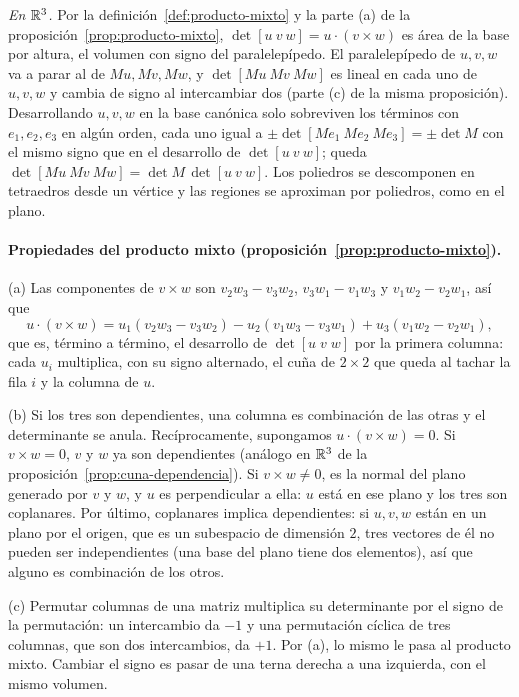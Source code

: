 \begin{demostracion}
\emph{En \(\mathbb{R}^3\).} Por la definición~\ref{def:producto-mixto} y la parte (a) de la
proposición~\ref{prop:producto-mixto}, \(\det[u\ v\ w]=u\cdot(v\times w)\) es área de la base
por altura, el volumen con signo del paralelepípedo. El paralelepípedo de \(u,v,w\) va a
parar al de \(Mu,Mv,Mw\), y \(\det[Mu\ Mv\ Mw]\) es lineal en cada uno de \(u,v,w\) y cambia
de signo al intercambiar dos (parte (c) de la misma proposición). Desarrollando \(u,v,w\) en
la base canónica solo sobreviven los términos con \(e_1,e_2,e_3\) en algún orden, cada uno
igual a \(\pm\det[Me_1\ Me_2\ Me_3]=\pm\det M\) con el mismo signo que en el desarrollo de
\(\det[u\ v\ w]\); queda \(\det[Mu\ Mv\ Mw]=\det M\,\det[u\ v\ w]\). Los poliedros se
descomponen en tetraedros desde un vértice y las regiones se aproximan por poliedros, como
en el plano.
\end{demostracion}

\paragraph{Propiedades del producto mixto (proposición~\ref{prop:producto-mixto}).}
\begin{demostracion}
(a) Las componentes de \(v\times w\) son \(v_2w_3-v_3w_2\), \(v_3w_1-v_1w_3\) y
\(v_1w_2-v_2w_1\), así que
\[
  u\cdot(v\times w)=u_1(v_2w_3-v_3w_2)-u_2(v_1w_3-v_3w_1)+u_3(v_1w_2-v_2w_1),
\]
que es, término a término, el desarrollo de \(\det[u\;v\;w]\) por la primera columna: cada
\(u_i\) multiplica, con su signo alternado, el cuña de \(2\times2\) que queda al tachar la
fila \(i\) y la columna de \(u\).

(b) Si los tres son dependientes, una columna es combinación de las otras y el determinante
se anula. Recíprocamente, supongamos \(u\cdot(v\times w)=0\). Si \(v\times w=0\), \(v\) y
\(w\) ya son dependientes (análogo en \(\mathbb{R}^3\) de la
proposición~\ref{prop:cuna-dependencia}). Si \(v\times w\neq0\), es la normal del plano generado por \(v\) y \(w\), y \(u\) es
perpendicular a ella: \(u\) está en ese plano y los tres son coplanares. Por último,
coplanares implica dependientes: si \(u,v,w\) están en un plano por el origen, que es un
subespacio de dimensión \(2\), tres vectores de él no pueden ser independientes (una base
del plano tiene dos elementos), así que alguno es combinación de los otros.

(c) Permutar columnas de una matriz multiplica su determinante por el signo de la
permutación: un intercambio da \(-1\) y una permutación cíclica de tres columnas, que son dos
intercambios, da \(+1\). Por (a), lo mismo le pasa al producto mixto. Cambiar el signo es
pasar de una terna derecha a una izquierda, con el mismo volumen.
\end{demostracion}

